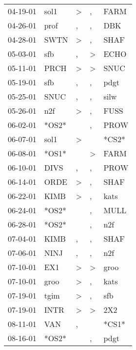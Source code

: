 \begin{supertabular}{lllll}
 04-19-01 &   sol1 &     \textgreater &                , &   FARM \\
 04-26-01 &   prof &                , &                , &    DBK \\
 04-28-01 &   SWTN &     \textgreater &                , &   SHAF \\
 05-03-01 &    sfb &                , &     \textgreater &   ECHO \\
 05-11-01 &   PRCH &     \textgreater &     \textgreater &   SNUC \\
 05-19-01 &    sfb &                , &                , &   pdgt \\
 05-25-01 &   SNUC &                , &                , &   silw \\
 05-26-01 &    n2f &     \textgreater &                , &   FUSS \\
 06-02-01 &  *OS2* &                  &                , &   PROW \\
 06-07-01 &   sol1 &     \textgreater &                  &  *CS2* \\
 06-08-01 &  *OS1* &                  &     \textgreater &   FARM \\
 06-10-01 &   DIVS &                , &                , &   PROW \\
 06-14-01 &   ORDE &     \textgreater &                , &   SHAF \\
 06-22-01 &   KIMB &     \textgreater &                , &   kats \\
 06-24-01 &  *OS2* &                  &                , &   MULL \\
 06-28-01 &  *OS2* &                  &                , &    n2f \\
 07-04-01 &   KIMB &                , &                , &   SHAF \\
 07-06-01 &   NINJ &                , &                , &    n2f \\
 07-10-01 &    EX1 &     \textgreater &     \textgreater &   groo \\
 07-10-01 &   groo &     \textgreater &                , &   kats \\
 07-19-01 &   tgim &     \textgreater &                , &    sfb \\
 07-19-01 &   INTR &     \textgreater &     \textgreater &    2X2 \\
 08-11-01 &    VAN &                , &                  &  *CS1* \\
 08-16-01 &  *OS2* &                  &                , &   pdgt \\

\end{supertabular}
